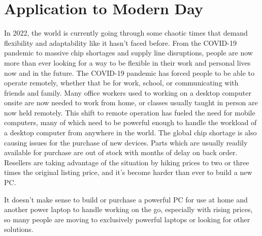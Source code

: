 \section{Application to Modern Day}\label{ApplicationToModernDay}

In 2022, the world is currently going through some chaotic times that demand flexibility and adaptability like it hasn't faced before.
From the COVID-19 pandemic to massive chip shortages and supply line disruptions, people are now more than ever looking for a way to be flexible in their work and personal lives now and in the future.
The COVID-19 pandemic has forced people to be able to operate remotely, whether that be for work, school, or communicating with friends and family.
Many office workers used to working on a desktop computer onsite are now needed to work from home, or classes usually taught in person are now held remotely.
This shift to remote operation has fueled the need for mobile computers, many of which need to be powerful enough to handle the workload of a desktop computer from anywhere in the world.
The global chip shortage is also causing issues for the purchase of new devices.
Parts which are usually readily available for purchase are out of stock with months of delay on back order.
Resellers are taking advantage of the situation by hiking prices to two or three times the original listing price, and it's become harder than ever to build a new PC.

It doesn't make sense to build or purchase a powerful PC for use at home and another power laptop to handle working on the go, especially with rising prices, so many people are moving to exclusively powerful laptops or looking for other solutions.
